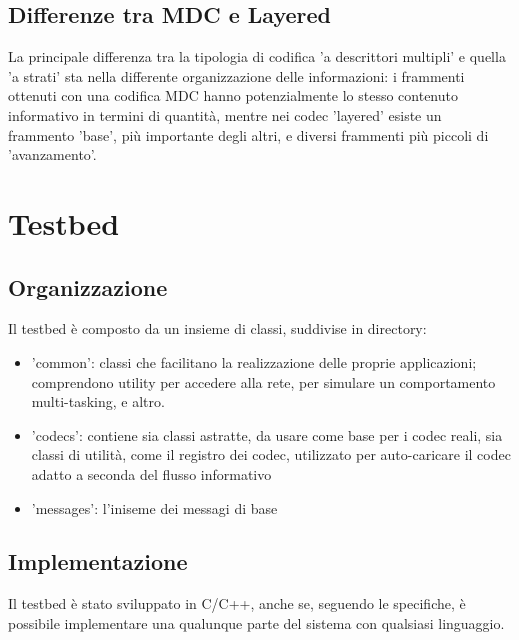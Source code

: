 \section{Differenze tra MDC e Layered}


La principale differenza tra la tipologia di codifica 'a descrittori multipli' e quella 'a strati' sta nella differente organizzazione delle informazioni: i frammenti ottenuti con una codifica MDC hanno potenzialmente lo stesso contenuto informativo in termini di quantità, mentre nei codec 'layered' esiste un frammento 'base', più importante degli altri, e diversi frammenti più piccoli di 'avanzamento'.






\chapter{Testbed}



\section{Organizzazione}


Il testbed è composto da un insieme di classi, suddivise in directory:



\begin{itemize}
\item 'common': classi che facilitano la realizzazione delle proprie applicazioni; comprendono utility per accedere alla rete, per simulare un comportamento multi-tasking, e altro.

\item 'codecs': contiene sia classi astratte, da usare come base per i codec reali, sia classi di utilità, come il registro dei codec, utilizzato per auto-caricare il codec adatto a seconda del flusso informativo

\item 'messages': l'iniseme dei messagi di base
\end{itemize}




\section{Implementazione}


Il testbed è stato sviluppato in C/C++, anche se, seguendo le specifiche, è possibile implementare una qualunque parte del sistema con qualsiasi linguaggio.






